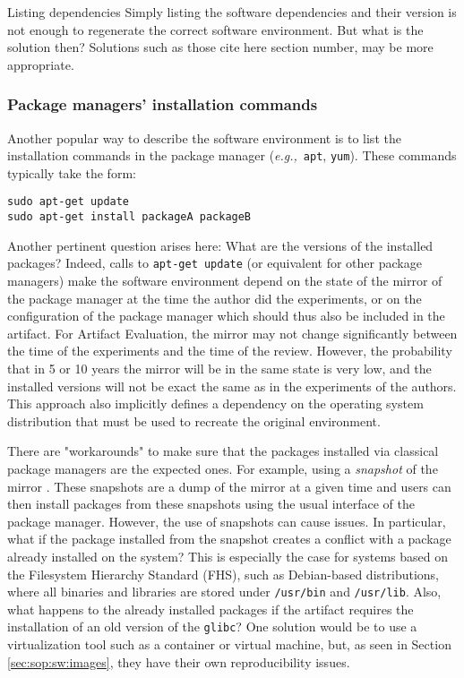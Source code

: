 \documentclass[sigconf,natbib=false]{acmart}
\newcommand{\eg}{\emph{e.g.,}}
\newcommand{\aeval}{Artifact Evaluation}
\newcommand{\fmc}[1]{{\color{magenta} #1}} %
\begin{document}
\begin{lesson}{Listing dependencies}{}
  Simply listing the software dependencies and their version is not enough to regenerate the correct software environment. \fmc{But what is the solution then? Solutions such as those cite here section number, may be more appropriate.}
\end{lesson}

\subsubsection{Package managers' installation commands}

Another popular way to describe the software environment is to list the installation commands in the package manager (\eg\ \texttt{apt}, \texttt{yum}).
These commands typically take the form:

\begin{verbatim}
sudo apt-get update
sudo apt-get install packageA packageB
\end{verbatim}

Another pertinent question arises here: What are the versions of the installed packages?
Indeed, calls to \texttt{apt-get update} (or equivalent for other package managers) make the software environment depend on the state of the mirror of the package manager at the time the author did the experiments, or on the configuration of the package manager which should thus also be included in the artifact.
For \aeval, the mirror may not change significantly between the time of the experiments and the time of the review.
However, the probability that in 5 or 10 years the mirror will be in the same state is very low, and the installed versions will not be exact the same as in the experiments of the authors.
This approach also implicitly defines a dependency on the operating system distribution that must be used to recreate the original environment.

There are "workarounds" to make sure that the packages installed via classical package managers are the expected ones. 
For example, using a \emph{snapshot} of the mirror \cite{debian-snapshot}.
These snapshots are a dump of the mirror at a given time and users can then install packages from these snapshots using the usual interface of the package manager.
However, the use of snapshots can cause issues.
In particular, what if the package installed from the snapshot creates a conflict with a package already installed on the system?
This is especially the case for systems based on the Filesystem Hierarchy Standard (FHS), such as Debian-based distributions, where all binaries and libraries are stored under \texttt{/usr/bin} and \texttt{/usr/lib}.
Also, what happens to the already installed packages if the artifact requires the installation of an old version of the \texttt{glibc}? 
One solution would be to use a virtualization tool such as a container or virtual machine, but, as seen in Section \ref{sec:sop:sw:images}, they have their own reproducibility issues.
\end{document}
